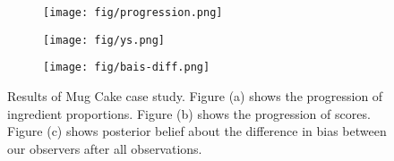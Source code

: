 \begin{figure}
    \centering
    \begin{subfigure}[b]{0.32\textwidth}
        \centering
        \texttt{[image: fig/progression.png]}
        \caption{}
        \label{subfig:exp:progression}
    \end{subfigure}
    \hfill
    \begin{subfigure}[b]{0.32\textwidth}
        \centering
        \texttt{[image: fig/ys.png]}
        \caption{}
        \label{subfig:exp:ys}
    \end{subfigure}
    \hfill
    \begin{subfigure}[b]{0.32\textwidth}
        \centering
        \texttt{[image: fig/bais-diff.png]}
        \caption{}
        \label{subfig:exp:bias-diff}
    \end{subfigure}
    \hfill
    \caption{
        Results of Mug Cake case study.
        Figure (a) shows the progression of ingredient proportions.
        Figure (b) shows the progression of scores.
        Figure (c) shows posterior belief about the difference in bias between our observers after all observations.
    }
    \label{fig:exp-res}
\end{figure}
